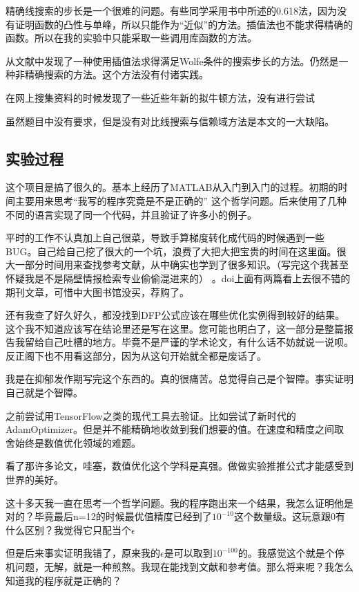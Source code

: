 \documentclass[11pt, a4paper]{article}
\begin{document}
精确线搜索的步长是一个很难的问题。有些同学采用书中\cite{高立2014数}所述的0.618法，因为没有证明函数的凸性与单峰，所以只能作为“近似”的方法。插值法也不能求得精确的函数。所以在我的实验中只能采取一些调用库函数的方法。

从文献\cite{Nocedal2006NO}中发现了一种使用插值法求得满足Wolfe条件的搜索步长的方法。仍然是一种非精确搜索的方法。这个方法没有付诸实践。

在网上搜集资料的时候发现了一些近些年新的拟牛顿方法\cite{WEI20061156}，没有进行尝试

虽然题目中没有要求，但是没有对比线搜索与信赖域方法是本文的一大缺陷。

\subsection{实验过程}
这个项目是搞了很久的。基本上经历了MATLAB从入门到入门的过程。初期的时间主要用来思考“我写的程序究竟是不是正确的”
这个哲学问题。后来使用了几种不同的语言实现了同一个代码，并且验证了许多小的例子。

平时的工作不认真加上自己很菜，导致手算梯度转化成代码的时候遇到一些BUG。自己给自己挖了很大的一个坑，浪费了大把大把宝贵的时间在这里面。很大一部分时间用来查找参考文献，从中确实也学到了很多知识。（写完这个我甚至怀疑我是不是隔壁情报检索专业偷偷混进来的）
。doi上面有两篇看上去很不错的期刊文章，可惜中大图书馆没买，荐购了。

还有我查了好久好久，都没找到DFP公式应该在哪些优化实例得到较好的结果。这个我不知道应该写在结论里还是写在这里。您可能也明白了，这一部分是整篇报告我留给自己吐槽的地方。毕竟不是严谨的学术论文，有什么话不妨就说一说呗。反正阁下也不用看这部分，因为从这句开始就全都是废话了。

我是在抑郁发作期写完这个东西的。真的很痛苦。总觉得自己是个智障。事实证明自己就是个智障。

之前尝试用TensorFlow之类的现代工具去验证。比如尝试了新时代的AdamOptimizer。但是并不能精确地收敛到我们想要的值。在速度和精度之间取舍始终是数值优化领域的难题。

看了那许多论文，哇塞，数值优化这个学科是真强。做做实验推推公式才能感受到世界的美好。

这十多天我一直在思考一个哲学问题。我的程序跑出来一个结果，我怎么证明他是对的？毕竟最后n=12的时候最优值精度已经到了$10^{-10}$这个数量级。这玩意跟0有什么区别？我觉得它只配当个$\epsilon$

但是后来事实证明我错了，原来我的$\epsilon$是可以取到$10^{-100}$的。我感觉这个就是个停机问题，无解，就是一种煎熬。我现在能找到文献和参考值。那么将来呢？我怎么知道我的程序就是正确的？
\end{document}
